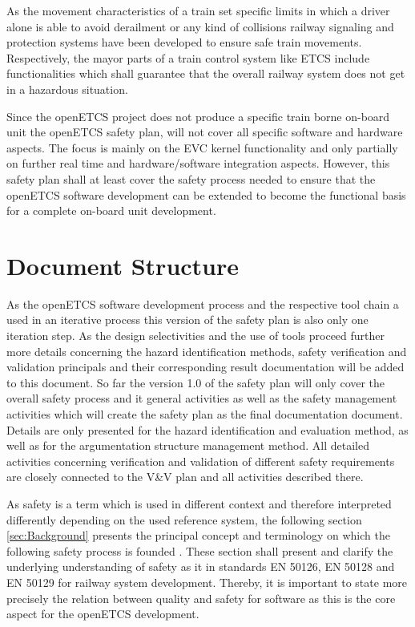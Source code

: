 \documentclass{template/openetcs_report}
\begin{document}
As the movement characteristics of a train set specific limits in which a driver alone is able to avoid derailment or any kind of collisions railway signaling and protection systems have been developed to ensure safe train movements. Respectively, the mayor parts of a train control system like ETCS include functionalities which shall guarantee that the overall railway system does not get in a hazardous situation.

Since the openETCS project does not produce a specific train borne on-board unit the openETCS safety plan, will not cover all specific software and hardware aspects. The focus is mainly on the EVC kernel functionality and only partially on further real time and hardware/software integration aspects. However, this safety plan shall at least cover the safety process needed to ensure that the openETCS software development can be extended to become the functional basis for a complete on-board unit development. 

\section{Document Structure}
\label{sec:document-structure}

As the openETCS software development process and the respective tool chain a used in an iterative process this version of the safety plan is also only one iteration step. As the design selectivities and the use of tools proceed further more details concerning the hazard identification methods, safety verification and validation principals and their corresponding result documentation will be added to this document. So far the version 1.0 of the safety plan will only cover the overall safety process and it general activities as well as the safety management activities which will create the safety plan as the final documentation document. Details are only presented for the hazard identification and evaluation method, as well as for the argumentation structure management method. All detailed activities concerning verification and validation of different safety requirements are closely connected to the V\&V plan and all activities described there. 

As safety is a term which is used in different context and therefore interpreted differently depending on the used reference system, the following section \ref{sec:Background} presents the principal concept and terminology on which the following safety process is founded \cite{Schnieder 2013}. These section shall present and clarify the underlying understanding of safety as it in standards EN 50126, EN 50128 and EN 50129 for railway system development. Thereby, it is important to state more precisely the relation between quality and safety for software as this is the core aspect for the openETCS development.
\end{document}
